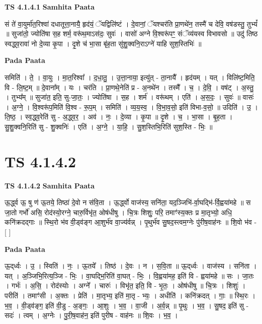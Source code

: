 \documentclass[17pt]{extarticle}
\begin{document}
\textbf{TS 4.1.4.1 } \newline
\textbf{Samhita Paata} \newline

सं ते॑ वा॒युर्मा॑त॒रिश्वा॑ दधातूत्ता॒नायै॒ हृद॑यं॒ ॅयद्विलि॑ष्टं । दे॒वानां॒ ॅयश्चर॑ति प्रा॒णथे॑न॒ तस्मै॑ च देवि॒ वष॑डस्तु॒ तुभ्यं᳚ ॥ सुजा॑तो॒ ज्योति॑षा स॒ह शर्म॒ वरू॑थ॒माऽस॑दः॒ सुवः॑ । वासो॑ अग्ने वि॒श्वरू॑पꣳ॒॒ संॅव्य॑यस्व विभावसो ॥ उदु॑ तिष्ठ स्वद्ध्व॒रावा॑ नो दे॒व्या कृ॒पा । दृ॒शे च॑ भा॒सा बृ॑ह॒ता सु॑शु॒क्वनि॒राऽग्ने॑ याहि सुश॒स्तिभिः॑ ॥ \newline

\textbf{Pada Paata} \newline

समिति॑ । ते॒ । वा॒युः । मा॒त॒रिश्वा᳚ । द॒धा॒तु॒ । उ॒त्ता॒नाया॒ इत्यु॑त् - ता॒नायै᳚ । हृद॑यम् । यत् । विलि॑ष्ट॒मिति॒ वि - लि॒ष्ट॒म् ॥ दे॒वाना᳚म् । यः । चर॑ति । प्रा॒णथे॒नेति॑ प्र - अ॒नथे॑न । तस्मै᳚ । च॒ । दे॒वि॒ । वष॑ट् । अ॒स्तु॒ । तुभ्य᳚म् ॥ सुजा॑त॒ इति॒ सु-जा॒तः॒ । ज्योति॑षा । स॒ह । शर्म॑ । वरू॑थम् । एति॑ । अ॒स॒दः॒ । सुवः॑ ॥ वासः॑ । अ॒ग्ने॒ । वि॒श्वरू॑प॒मिति॑ वि॒श्व - रू॒प॒म् । समिति॑ । व्य॒य॒स्व॒ । वि॒भा॒व॒सो॒ इति॑ विभा-व॒सो॒ ॥ उदिति॑ । उ॒ । ति॒ष्ठ॒ । स्व॒द्ध्व॒रेति॑ सु - अ॒द्ध्व॒र॒ । अव॑ । नः॒ । दे॒व्या । कृ॒पा ॥ दृ॒शे । च॒ । भा॒सा । बृ॒ह॒ता । सु॒शु॒क्वनि॒रिति॑ सु - शु॒क्वनिः॑ । एति॑ । अ॒ग्ने॒ । या॒हि॒ । सु॒श॒स्तिभि॒रिति॑ सुश॒स्ति - भिः॒ ॥  \newline




\section*{ TS 4.1.4.2 }

\textbf{TS 4.1.4.2 } \newline
\textbf{Samhita Paata} \newline

ऊ॒र्द्ध्व ऊ॒ षु ण॑ ऊ॒तये॒ तिष्ठा॑ दे॒वो न स॑वि॒ता । ऊ॒र्द्ध्वो वाज॑स्य॒ सनि॑ता॒ यद॒ञ्जिभि॑-र्वा॒घद्भि॑-र्वि॒ह्वया॑महे ॥ स जा॒तो गर्भो॑ असि॒ रोद॑स्यो॒रग्ने॒ चारु॒र्विभृ॑त॒ ओष॑धीषु । चि॒त्रः शिशुः॒ परि॒ तमाꣳ॑स्य॒क्तः प्र मा॒तृभ्यो॒ अधि॒ कनि॑क्रदद्गाः ॥ स्थि॒रो भ॑व वी॒ड्व॑ङ्ग आ॒शुर्भ॑व वा॒ज्य॑र्वन्न् । पृ॒थुर्भ॑व सु॒षद॒स्त्वम॒ग्नेः पु॑रीष॒वाह॑नः ॥ शि॒वो भ॑व - [  ] \newline

\textbf{Pada Paata} \newline

ऊ॒द्‌र्ध्वः । उ॒ । स्विति॑ । नः॒ । ऊ॒तये᳚ । तिष्ठ॑ । दे॒वः । न । स॒वि॒ता ॥ ऊ॒द्‌र्ध्वः । वाज॑स्य । सनि॑ता । यत् । अ॒ञ्जिभि॒रित्य॒ञ्जि - भिः॒ । वा॒घद्भि॒रिति॑ वा॒घत् - भिः॒ । वि॒ह्वया॑मह॒ इति॑ वि - ह्वया॑महे ॥ सः । जा॒तः । गर्भः॑ । अ॒सि॒ । रोद॑स्योः । अग्ने᳚ । चारुः॑ । विभृ॑त॒ इति॒ वि - भृ॒तः॒ । ओष॑धीषु ॥ चि॒त्रः । शिशुः॑ । परीति॑ । तमाꣳ॑सी । अ॒क्तः । प्रेति॑ । मा॒तृभ्य॒ इति॑ मा॒तृ - भ्यः॒ । अधीति॑ । कनि॑क्रदत् । गाः॒ ॥ स्थि॒रः । भ॒व॒ । वी॒ड्व॑ङ्ग॒ इति॑ वी॒डु - अ॒ङ्गः॒ । आ॒शुः । भ॒व॒ । वा॒जी । अ॒र्व॒न्न् ॥ पृ॒थुः । भ॒व॒ । सु॒षद॒ इति॑ सु - सदः॑ । त्वम् । अ॒ग्नेः । पु॒री॒ष॒वाह॑न॒ इति॑ पुरीष - वाह॑नः ॥ शि॒वः । भ॒व॒ ।  \newline
\end{document}
